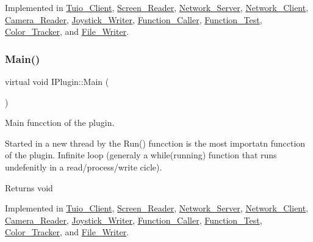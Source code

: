 Implemented in \hyperlink{class_tuio___client_aef7de42628eef1f5c0fb3ff83b26de8b}{Tuio\+\_\+\+Client}, \hyperlink{class_screen___reader_aaae80932d8f6af903ca93846eb4de234}{Screen\+\_\+\+Reader}, \hyperlink{class_network___server_a60edfbf13d3812f66381dca40fbe0801}{Network\+\_\+\+Server}, \hyperlink{class_network___client_a02e30223901e61514ee59eccec70dddf}{Network\+\_\+\+Client}, \hyperlink{class_camera___reader_a63163ba2ecf2ff470ca7e6a31dcabfb6}{Camera\+\_\+\+Reader}, \hyperlink{class_joystick___writer_a8c8c94397bbbb2058685ad6e0f92b4b1}{Joystick\+\_\+\+Writer}, \hyperlink{class_function___caller_a6ce3a356b5eb30c51d39f2ce0ecb9128}{Function\+\_\+\+Caller}, \hyperlink{class_function___test_ab2f00495eb55e7edf061498dcf7aaa4f}{Function\+\_\+\+Test}, \hyperlink{class_color___tracker_a37bf24d89aac609cb6a773b86d4edcb6}{Color\+\_\+\+Tracker}, and \hyperlink{class_file___writer_a8f9010f501d8349bd9e8895405a8de8b}{File\+\_\+\+Writer}.

\mbox{\label{class_i_plugin_ab5fdb3b0f7afdcee04324dca01766749}} 
\subsubsection{\texorpdfstring{Main()}{Main()}}
{\footnotesize\ttfamily virtual void I\+Plugin\+::\+Main (\begin{DoxyParamCaption}{ }\end{DoxyParamCaption})\hspace{0.3cm}{\ttfamily [pure virtual]}}



Main funcction of the plugin. 

Started in a new thread by the Run() funcction is the most importatn funcction of the plugin. Infinite loop (generaly a while(running) function that runs undefenitly in a read/process/write cicle). \begin{DoxyReturn}{Returns}
void 
\end{DoxyReturn}


Implemented in \hyperlink{class_tuio___client_a13aed5267c36dd0bc9b4dcf6939194d5}{Tuio\+\_\+\+Client}, \hyperlink{class_screen___reader_add5cdfdc432ed5e8baa6683213c6daba}{Screen\+\_\+\+Reader}, \hyperlink{class_network___server_aa9d6cd53b5c62355518ad0a32ba1444b}{Network\+\_\+\+Server}, \hyperlink{class_network___client_a711e61f7233983449a1f4a50a4009b87}{Network\+\_\+\+Client}, \hyperlink{class_camera___reader_af3fabc94e27e6ce1702d26829126b9dc}{Camera\+\_\+\+Reader}, \hyperlink{class_joystick___writer_aeb9c03f2389a5ed060b9c2a46fb84316}{Joystick\+\_\+\+Writer}, \hyperlink{class_function___caller_a4c39451baadbdc89f6f7e212638cb811}{Function\+\_\+\+Caller}, \hyperlink{class_function___test_a87d81cc4014216aa2523ef69c5b35dff}{Function\+\_\+\+Test}, \hyperlink{class_color___tracker_a6d533ef7ecaea3ea1b2ae149f9336cec}{Color\+\_\+\+Tracker}, and \hyperlink{class_file___writer_a0738556056b69f64bf524fee06a6e69f}{File\+\_\+\+Writer}.

